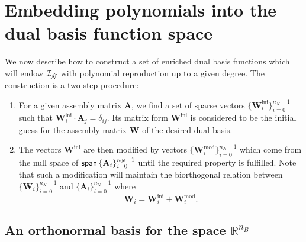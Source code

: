 \section{Embedding polynomials into the dual basis function space}\label{sec:algorithm}

We now describe how to construct a set of enriched dual basis functions which will endow $\mathcal{I}_{\hat{\mathcal{N}}}$ with polynomial reproduction up to a given degree. The construction is a two-step procedure:
\begin{enumerate}
\item For a given assembly matrix $\mathbf{A}$, we find a set of sparse vectors $\{\mathbf{W}^\text{ini}_i\}_{i=0}^{n_N-1}$ such that $\mathbf{W}^\text{ini}_i\cdot\mathbf{A}_j=\delta_{ij}$. Its matrix form $\mathbf{W}^\text{ini}$ is considered to be the initial guess for the assembly matrix $\mathbf{W}$ of the desired dual basis.
  \item The vectors $\mathbf{W}^\text{ini}$ are then modified by vectors $\{\mathbf{W}^\text{mod}_i\}_{i=0}^{n_N-1}$ which come from the null space of $\operatorname{\mathsf{span}}\left\{\mathbf{A}_i\right\}_{i=0}^{n_N-1}$ until the required property is fulfilled. Note that such a modification will maintain the biorthogonal relation between $\{\mathbf{W}_i\}_{i=0}^{n_N-1}$ and $\{\mathbf{A}_i\}_{i=0}^{n_N-1}$ where
\begin{equation}
	\mathbf{W}_i=\mathbf{W}^\text{ini}_i+\mathbf{W}^\text{mod}_i.
\end{equation}
\end{enumerate}


\subsection{An orthonormal basis for the space $\mathbb{R}^{n_B}$}

